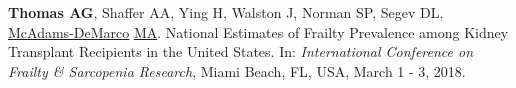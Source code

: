 \documentclass[10pt]{article}
\makeatletter
\newlength{\bibhang}
\newlength{\bibsep}
 {\@listi \global\bibsep\itemsep \global\advance\bibsep by\parsep}
\newenvironment{bibenum*}
  {\renewcommand\labelenumi{[\theenumi]}%
   \etaremune[
     topsep=0pt,
     itemsep=\bibsep,
     parsep=0pt,partopsep=0pt,
     itemindent=-\bibhang,
     leftmargin={\bibhang+\widthof{[999]}}]}
  {\endetaremune}
\makeatother
\begin{document}
\begin{bibenum*}




\item \textbf{Thomas AG}, Shaffer AA, Ying H, Walston J,
  Norman SP, Segev DL, \underline{McAdams-DeMarco} \underline{MA}.
  National Estimates of Frailty Prevalence among Kidney
  Transplant Recipients in the United States.
  In: \emph{International Conference on Frailty \& Sarcopenia Research},
  Miami Beach, FL, USA, March 1 - 3, 2018.




\end{bibenum*}
\end{document}

